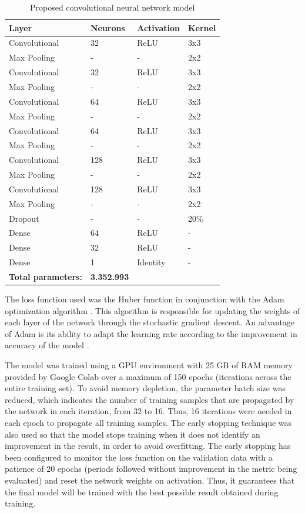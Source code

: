 \documentclass[a4paper,fleqn]{cas-sc}
\begin{document}
\begin{table}[h!]
	\caption{Proposed convolutional neural network model}
	\label{tab:modelo_cnn}
	\centering%
	\begin{minipage}{.6\textwidth}
		\begin{tabular*}{\textwidth}{llll}
			\hline
			\textbf{Layer} & \textbf{Neurons} & \textbf{Activation} & \textbf{Kernel}\\
			\hline
			Convolutional & 32 & ReLU & 3x3\\
			Max Pooling & - & - & 2x2\\
			Convolutional & 32 & ReLU & 3x3\\
			Max Pooling & - & - & 2x2\\
			Convolutional & 64 & ReLU & 3x3\\
			Max Pooling & - & - & 2x2\\
			Convolutional & 64 & ReLU & 3x3\\
			Max Pooling & - & - & 2x2\\
			Convolutional & 128 & ReLU & 3x3\\
			Max Pooling & - & - & 2x2\\
			Convolutional & 128 & ReLU & 3x3\\
			Max Pooling & - & - & 2x2\\
			Dropout & - & - & 20\%\\
			Dense & 64 & ReLU & -\\
			Dense & 32 & ReLU & -\\
			Dense & 1 & Identity & -\\
			\hline
			\textbf{Total parameters:} & \textbf{3.352.993}\\
			\hline
		\end{tabular*}
	\end{minipage}
\end{table}

The loss function used was the Huber function in conjunction with the Adam optimization algorithm \cite{kingma2017adam}. This algorithm is responsible for updating the weights of each layer of the network through the stochastic gradient descent. An advantage of Adam is its ability to adapt the learning rate according to the improvement in accuracy of the model \cite{kingma2017adam}.

The model was trained using a GPU environment with 25 GB of RAM memory provided by Google Colab over a maximum of 150 epochs (iterations across the entire training set). To avoid memory depletion, the parameter batch size was reduced, which indicates the number of training samples that are propagated by the network in each iteration, from 32 to 16. Thus, 16 iterations were needed in each epoch to propagate all training samples. The early stopping technique was also used so that the model stops training when it does not identify an improvement in the result, in order to avoid overfitting. The early stopping has been configured to monitor the loss function on the validation data with a patience of 20 epochs (periods followed without improvement in the metric being evaluated) and reset the network weights on activation. Thus, it guarantees that the final model will be trained with the best possible result obtained during training.
\end{document}
